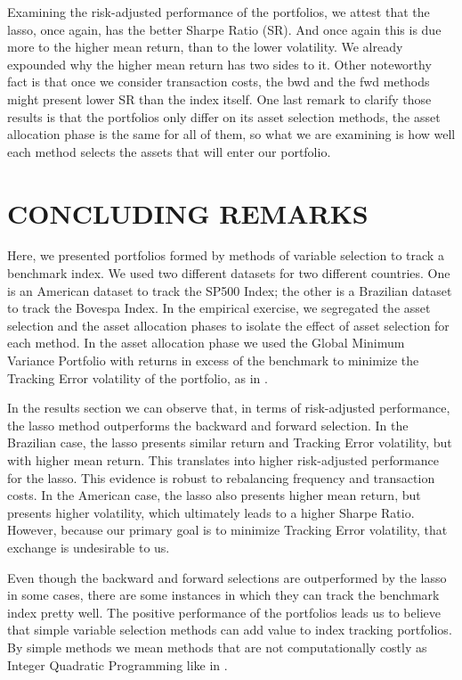 \documentclass[12pt,oneside,a4paper]{memoir}
\begin{document}
Examining the risk-adjusted performance of the portfolios, we attest that the lasso, once again, has the better Sharpe Ratio (SR).
And once again this is due more to the higher mean return, than to the lower volatility.
We already expounded why the higher mean return has two sides to it.
Other noteworthy fact is that once we consider transaction costs, the bwd and the fwd methods might present lower SR than the index itself.
One last remark to clarify those results is that the portfolios only differ on its asset selection methods, the asset allocation phase is the same for all of them, so what we are examining is how well each method selects the assets that will enter our portfolio.

\section{CONCLUDING REMARKS} \label{sec:conc}

Here, we presented portfolios formed by methods of variable selection to track a benchmark index.
We used two different datasets for two different countries.
One is an American dataset to track the SP500 Index; the other is a Brazilian dataset to track the Bovespa Index.
In the empirical exercise, we segregated the asset selection and the asset allocation phases to isolate the effect of asset selection for each method.
In the asset allocation phase we used the Global Minimum Variance Portfolio with returns in excess of the benchmark to minimize the Tracking Error volatility of the portfolio, as in .

In the results section we can observe that, in terms of risk-adjusted performance, the lasso method outperforms the backward and forward selection. 
In the Brazilian case, the lasso presents similar return and Tracking Error volatility, but with higher mean return.
This translates into higher risk-adjusted performance for the lasso.
This evidence is robust to rebalancing frequency and transaction costs.
In the American case, the lasso also presents higher mean return, but presents higher volatility, which ultimately leads to a higher Sharpe Ratio.
However, because our primary goal is to minimize Tracking Error volatility, that exchange is undesirable to us.

Even though the backward and forward selections are outperformed by the lasso in some cases, there are some instances in which they can track the benchmark index pretty well.
The positive performance of the portfolios leads us to believe that simple variable selection methods can add value to index tracking portfolios.
By simple methods we mean methods that are not computationally costly as Integer Quadratic Programming like in .
\end{document}
